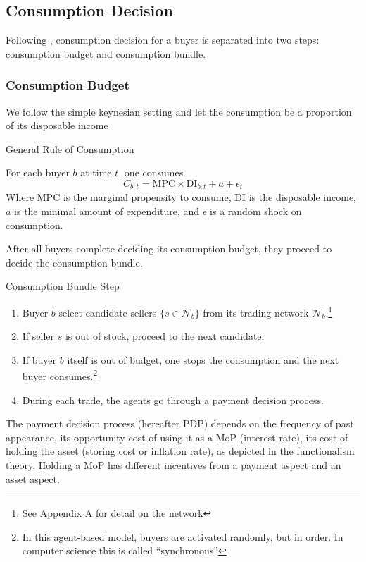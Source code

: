 
\subsection{Consumption Decision}

Following \citet*{HandbookABM}, consumption decision for a buyer is separated into two steps: consumption budget and consumption bundle.

\subsubsection*{Consumption Budget}

We follow the simple keynesian setting and let the consumption be a proportion of its disposable income

\begin{definition}{General Rule of Consumption}

   For each buyer $b$ at time $t$, one consumes
   \begin{equation}
      C_{b,t} = \mathrm{MPC}\times \mathrm{DI}_{b,t} + a + \epsilon_t
   \end{equation}
   Where $\mathrm{MPC}$ is the marginal propensity to consume, $\mathrm{DI}$ is the disposable income, $a$ is the minimal amount of expenditure, and $\epsilon$ is a random shock on consumption.
\end{definition}

After all buyers complete deciding its consumption budget, they proceed to decide the consumption bundle.

\begin{definition}
{Consumption Bundle Step}
\begin{enumerate}
   \item Buyer $b$ select candidate sellers $\{s \in \mathcal{N}_b\}$ from its trading network $\mathcal{N}_b$.\footnote{See Appendix A for detail on the network}
   \item If seller $s$ is out of stock, proceed to the next candidate.
   \item If buyer $b$ itself is out of budget, one stops the consumption and the next buyer consumes.\footnote{In this agent-based model, buyers are activated randomly, but in order. In computer science this is called ``synchronous''}
   \item During each trade, the agents go through a payment decision process.
\end{enumerate}
\end{definition}

The payment decision process (hereafter PDP) depends on the frequency of past appearance, its opportunity cost of using it as a MoP (interest rate), its cost of holding the asset (storing cost or inflation rate), as depicted in the functionalism theory. Holding a MoP has different incentives from a payment aspect and an asset aspect.





